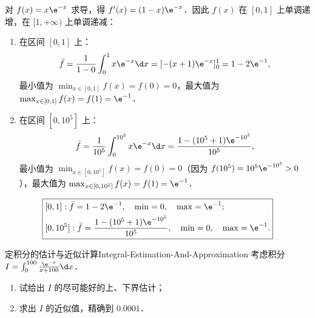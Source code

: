 \begin{solution}

    对 $f(x) = x\e^{-x}$ 求导，得 $f'(x) = (1 - x)\e^{-x}$．因此 $f(x)$ 在 $[0, 1]$ 上单调递增，在 $[1, +\infty)$ 上单调递减：
    \begin{enumerate}
        \item 在区间 $[0, 1]$ 上：
              \begin{equation}
                  \bar{f} = \frac{1}{1 - 0}\int_0^1 x\e^{-x} \d x = [-(x + 1)\e^{-x}]_0^1 = 1 - 2\e^{-1},
              \end{equation}
              最小值为 $\min_{x\in [0, 1]} f(x) = f(0) = 0$，最大值为 $\max_{x\in [0, 1]} f(x) = f(1) = \e^{-1}$．
        \item 在区间 $[0, 10^5]$ 上：
              \begin{equation}
                  \bar{f} = \frac{1}{10^5}\int_0^{10^5} x\e^{-x} \d x = \frac{1 - (10^5 + 1)\e^{-10^5}}{10^5},
              \end{equation}
              最小值为 $\min_{x\in [0, 10^5]} f(x) = f(0) = 0$（因为 $f(10^5) = 10^5 \e^{-10^5} > 0$），最大值为 $\max_{x\in [0, 10^5]} f(x) = f(1) = \e^{-1}$．
    \end{enumerate}
    \begin{equation}
        \boxed{\begin{aligned}
                 & [0, 1]: \bar{f} = 1 - 2\e^{-1}, \quad \min = 0, \quad \max = \e^{-1};                             \\
                 & [0, 10^5]: \bar{f} = \frac{1 - (10^5 + 1)\e^{-10^5}}{10^5}, \quad \min = 0, \quad \max = \e^{-1}.
            \end{aligned}}
    \end{equation}
\end{solution}

\begin{problem}{定积分的估计与近似计算}{Integral-Estimation-And-Approximation}
    考虑积分 $I = \int_0^{100} \frac{\e^{-x}}{x + 100} \d x$．
    \begin{enumerate}
        \item 试给出 $I$ 的尽可能好的上、下界估计；
        \item 求出 $I$ 的近似值，精确到 $0.0001$．
    \end{enumerate}
\end{problem}

